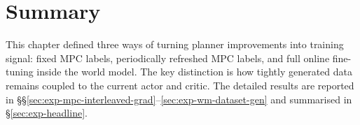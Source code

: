 \section{Summary}
\label{sec:mpcd-discussion}

This chapter defined three ways of turning planner improvements into
training signal: fixed MPC labels, periodically refreshed MPC labels,
and full online fine-tuning inside the world model. The key distinction
is how tightly generated data remains coupled to the current actor and
critic. The detailed results are reported in
\S\S\ref{sec:exp-mpc-interleaved-grad}--\ref{sec:exp-wm-dataset-gen} and
summarised in \S\ref{sec:exp-headline}.
